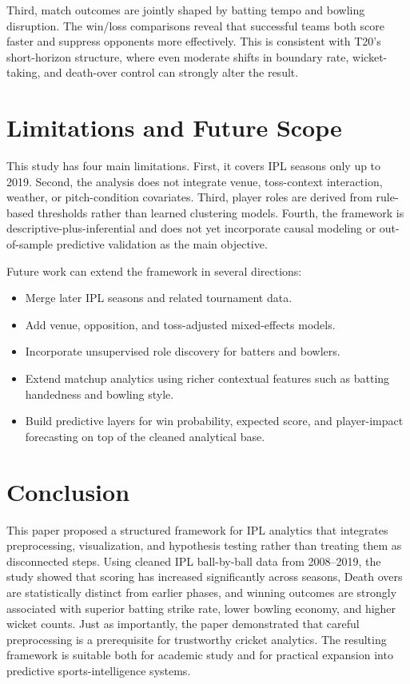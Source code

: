 \documentclass[conference]{IEEEtran}
\begin{document}
Third, match outcomes are jointly shaped by batting tempo and bowling disruption. The win/loss comparisons reveal that successful teams both score faster and suppress opponents more effectively. This is consistent with T20's short-horizon structure, where even moderate shifts in boundary rate, wicket-taking, and death-over control can strongly alter the result.

\section{Limitations and Future Scope}
This study has four main limitations. First, it covers IPL seasons only up to 2019. Second, the analysis does not integrate venue, toss-context interaction, weather, or pitch-condition covariates. Third, player roles are derived from rule-based thresholds rather than learned clustering models. Fourth, the framework is descriptive-plus-inferential and does not yet incorporate causal modeling or out-of-sample predictive validation as the main objective.

Future work can extend the framework in several directions:
\begin{itemize}
    \item Merge later IPL seasons and related tournament data.
    \item Add venue, opposition, and toss-adjusted mixed-effects models.
    \item Incorporate unsupervised role discovery for batters and bowlers.
    \item Extend matchup analytics using richer contextual features such as batting handedness and bowling style.
    \item Build predictive layers for win probability, expected score, and player-impact forecasting on top of the cleaned analytical base.
\end{itemize}

\section{Conclusion}
This paper proposed a structured framework for IPL analytics that integrates preprocessing, visualization, and hypothesis testing rather than treating them as disconnected steps. Using cleaned IPL ball-by-ball data from 2008--2019, the study showed that scoring has increased significantly across seasons, Death overs are statistically distinct from earlier phases, and winning outcomes are strongly associated with superior batting strike rate, lower bowling economy, and higher wicket counts. Just as importantly, the paper demonstrated that careful preprocessing is a prerequisite for trustworthy cricket analytics. The resulting framework is suitable both for academic study and for practical expansion into predictive sports-intelligence systems.
\end{document}
